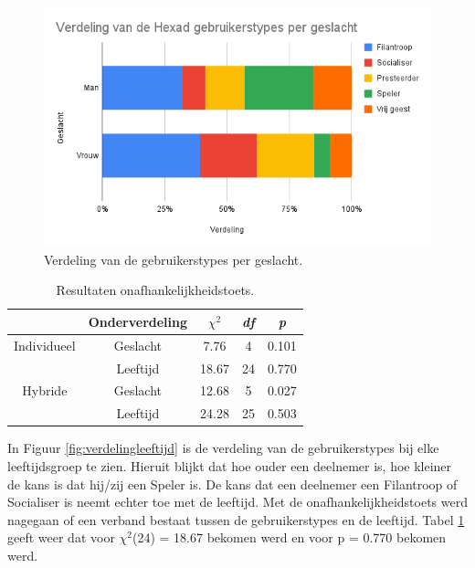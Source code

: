 \begin{figure}
    \includegraphics[width=\linewidth]{VerdelingGeslacht.png}
    \caption{Verdeling van de gebruikerstypes per geslacht.}
    \label{fig:verdelinggeslacht}
\end{figure}

\begin{table}
    \begin{center}
    \begin{tabular}{c|c|c|c|c}
        & Onderverdeling & $\chi^2$ & \textit{df} & \textit{p}     \\  
        \hline
        Individueel & Geslacht       & 7.76  & 4  & 0.101 \\
        & Leeftijd       & 18.67 & 24 & 0.770 \\ 
        \hline
        Hybride     & Geslacht       & 12.68 & 5  & 0.027 \\
        & Leeftijd       & 24.28 & 25 & 0.503 \\
    \end{tabular}
    \end{center}
\caption{Resultaten onafhankelijkheidstoets.}
\label{tab:onafhankelijkheidstoets}
\end{table}

In Figuur \ref{fig:verdelingleeftijd} is de verdeling van de gebruikerstypes bij elke leeftijdsgroep te zien. Hieruit blijkt dat hoe ouder een deelnemer is, hoe kleiner de kans is dat hij/zij een Speler is. De kans dat een deelnemer een Filantroop of Socialiser is neemt echter toe met de leeftijd. Met de onafhankelijkheidstoets werd nagegaan of een verband bestaat tussen de gebruikerstypes en de leeftijd. Tabel \ref{tab:onafhankelijkheidstoets} geeft weer dat voor $\chi^2$(24) = 18.67 bekomen werd en voor p = 0.770 bekomen werd.


